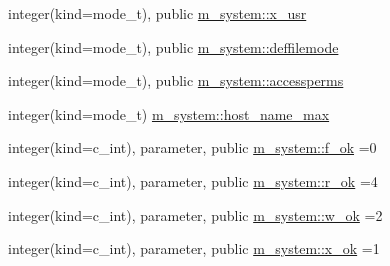 \begin{DoxyCompactItemize}
\item 
integer(kind=mode\+\_\+t), public \mbox{\hyperlink{namespacem__system_a450a3fddafad75b241f370b47b17d97c}{m\+\_\+system\+::x\+\_\+usr}}
\item 
integer(kind=mode\+\_\+t), public \mbox{\hyperlink{namespacem__system_a04a5b1ef384bcbb8ad3b0c81ce95001a}{m\+\_\+system\+::deffilemode}}
\item 
integer(kind=mode\+\_\+t), public \mbox{\hyperlink{namespacem__system_a82a13cb7ac2c5f0e6e34fc3cfc010d42}{m\+\_\+system\+::accessperms}}
\item 
integer(kind=mode\+\_\+t) \mbox{\hyperlink{namespacem__system_a6501a3671053239dae9b69b95c0a5f55}{m\+\_\+system\+::host\+\_\+name\+\_\+max}}
\item 
integer(kind=c\+\_\+int), parameter, public \mbox{\hyperlink{namespacem__system_ad34c4f18dd5b7dbe445cca25bbae9a74}{m\+\_\+system\+::f\+\_\+ok}} =0
\item 
integer(kind=c\+\_\+int), parameter, public \mbox{\hyperlink{namespacem__system_a86ca380e22d30a8795b4d99f1836ece8}{m\+\_\+system\+::r\+\_\+ok}} =4
\item 
integer(kind=c\+\_\+int), parameter, public \mbox{\hyperlink{namespacem__system_a8f34e61e94106b90ca48b9ef1165474c}{m\+\_\+system\+::w\+\_\+ok}} =2
\item 
integer(kind=c\+\_\+int), parameter, public \mbox{\hyperlink{namespacem__system_a0eca0d5b431ad6fbde6f40407550e7aa}{m\+\_\+system\+::x\+\_\+ok}} =1
\end{DoxyCompactItemize}
